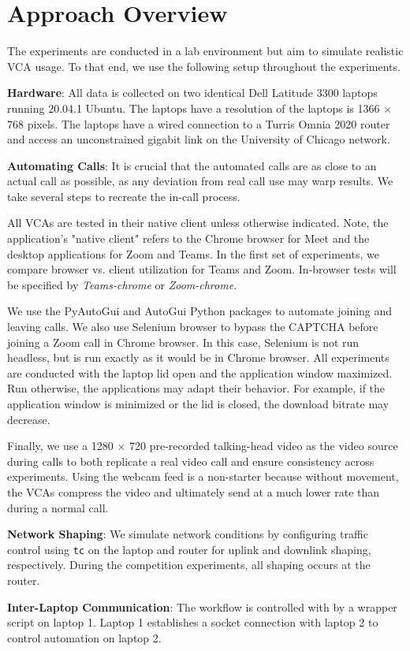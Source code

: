 \section{Approach Overview}\label{sec:approach}

The experiments are conducted in a lab environment but aim to simulate realistic VCA usage. To that end, we use the following setup throughout the experiments.

\textbf{Hardware}: All data is collected on two identical Dell Latitude 3300 laptops running 20.04.1 Ubuntu. The laptops have a resolution of the laptops is 1366 $\times$ 768 pixels. The laptops have a wired connection to a Turris Omnia 2020 router and access an unconstrained gigabit link on the University of Chicago network. 

\textbf{Automating Calls}: It is crucial that the automated calls are as close to an actual call as possible, as any deviation from real call use may warp results. We take several steps to recreate the in-call process.

All VCAs are tested in their native client unless otherwise indicated. Note, the application's "native client" refers to the Chrome browser for Meet and the desktop applications for Zoom and Teams. In the first set of experiments, we compare browser vs. client utilization for Teams and Zoom. In-browser tests will be specified by \textit{Teams-chrome} or \textit{Zoom-chrome}. 

We use the PyAutoGui and AutoGui Python packages to automate joining and leaving calls. We also use Selenium browser to bypass the CAPTCHA before joining a Zoom call in Chrome browser. In this case, Selenium is not run headless, but is run exactly as it would be in Chrome browser. All experiments are conducted with the laptop lid open and the application window maximized. Run otherwise, the applications may adapt their behavior. For example, if the application window is minimized or the lid is closed, the download bitrate may decrease.

Finally, we use a 1280 $\times$ 720 pre-recorded talking-head video as the video source during calls to both replicate a real video call and ensure consistency across experiments. Using the webcam feed is a non-starter because without movement, the VCAs compress the video and ultimately send at a much lower rate than during a normal call. 

\textbf{Network Shaping}: We simulate network conditions by configuring traffic control using \texttt{tc} on the laptop and router for uplink and downlink shaping, respectively. During the competition experiments, all shaping occurs at the router.

\textbf{Inter-Laptop Communication}: The workflow is controlled with by a wrapper script on laptop 1. Laptop 1 establishes a socket connection with laptop 2 to control automation on laptop 2.
